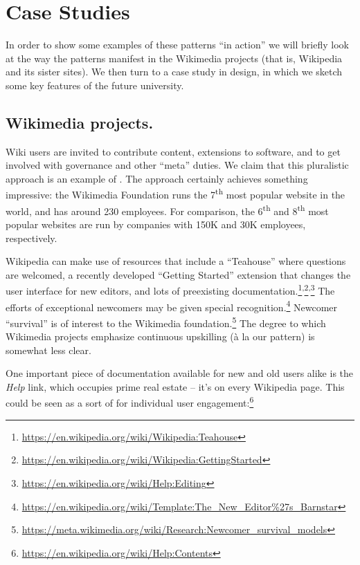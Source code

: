 \section{Case Studies}\label{sec:Case Studies}

In order to show some examples of these patterns ``in action'' we will
briefly look at the way the patterns manifest in the Wikimedia
projects (that is, Wikipedia and its sister sites).  We then turn to a
case study in design, in which we sketch some key features of the
future university.

\subsection{Wikimedia projects.}

Wiki users are invited to contribute content, extensions to software,
and to get involved with governance and other ``meta'' duties.  We
claim that this pluralistic approach is an example of
.  The approach certainly achieves something
impressive: the Wikimedia Foundation runs the 7\textsuperscript{th}
most popular website in the world, and has around 230 employees.  For
comparison, the 6\textsuperscript{th} and 8\textsuperscript{th} most
popular websites are run by companies with 150K and 30K employees,
respectively.

Wikipedia  can make use of resources that
include a ``Teahouse'' where questions are welcomed, a recently
developed ``Getting Started'' extension that changes the user
interface for new editors, and lots of preexisting
documentation.\footnote{\url{https://en.wikipedia.org/wiki/Wikipedia:Teahouse}}\textsuperscript{,}\footnote{\url{https://en.wikipedia.org/wiki/Wikipedia:GettingStarted}}\textsuperscript{,}\footnote{\url{https://en.wikipedia.org/wiki/Help:Editing}}
The efforts of exceptional newcomers may be given special
recognition.\footnote{\url{https://en.wikipedia.org/wiki/Template:The_New_Editor\%27s_Barnstar}}
Newcomer ``survival'' is of interest to the Wikimedia
foundation.\footnote{\url{https://meta.wikimedia.org/wiki/Research:Newcomer_survival_models}}
The degree to which Wikimedia projects emphasize continuous upskilling
(\`a la our  pattern) is somewhat less clear.

One important piece of documentation available for new and old users
alike is the \emph{Help} link, which occupies prime real estate --
it's on every Wikipedia page.  This could be seen as a sort of
 for individual user
engagement:\footnote{\url{https://en.wikipedia.org/wiki/Help:Contents}}

